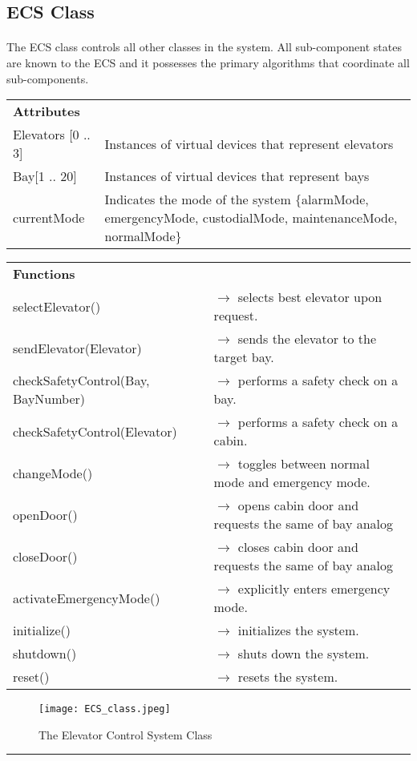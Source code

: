 \documentclass[12pt]{article}
\begin{document}
	\subsection*{ECS Class}
	\paragraph{} The ECS class controls all other classes in the system. All sub-component states are known to the ECS and it 
	possesses the primary algorithms that coordinate all sub-components.
	\begin{table}[H]
		\begin{tabular}{lp{12cm}}
			\textbf{Attributes} & \\ 
			Elevators [0 .. 3]  & Instances of virtual devices that represent elevators \\
		   	Bay[1 .. 20]        & Instances of virtual devices that represent bays \\
			currentMode         & Indicates the mode of the system $\{$alarmMode, emergencyMode, custodialMode, maintenanceMode, normalMode$\}$ \\
		\end{tabular}
	\end{table}     
	\begin{table}[H]
		\begin{tabular}{lp{12cm}}
			\textbf{Functions}                  & \\
			selectElevator()                    & $\rightarrow$ selects best elevator upon request. \\
			sendElevator(Elevator)        		& $\rightarrow$ sends the elevator to the target bay.\\
			checkSafetyControl(Bay, BayNumber) 	& $\rightarrow$ performs a safety check on a bay.\\
			checkSafetyControl(Elevator) 		& $\rightarrow$ performs a safety check on a cabin.\\
			changeMode() 						& $\rightarrow$ toggles between normal mode and emergency mode.\\
			openDoor() 							& $\rightarrow$ opens cabin door and requests the same of bay analog\\
			closeDoor() 						& $\rightarrow$ closes cabin door and requests the same of bay analog\\
			activateEmergencyMode() 			& $\rightarrow$ explicitly enters emergency mode.\\
			initialize() 						& $\rightarrow$ initializes the system.\\
			shutdown() 							& $\rightarrow$ shuts down the system.\\
			reset() 							& $\rightarrow$ resets the system.\\
		\end{tabular}
	\end{table}
	\begin{figure}[H]
  		\centerline{\texttt{[image: ECS\_class.jpeg]}}
  		\caption{The Elevator Control System Class}
  		\label{fig:ecs_class}
	\end{figure}
	\par\noindent\rule{\textwidth}{0.4pt}
	
\end{document}
